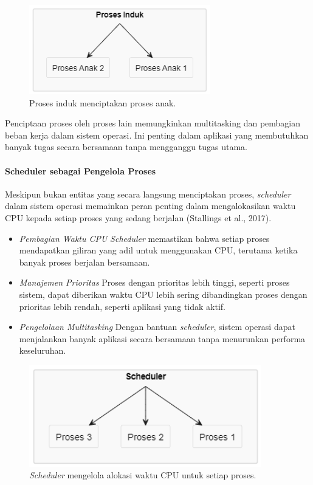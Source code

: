 \documentclass[12pt]{article}
\begin{document}
\begin{figure}[h]
    \centering
    \includegraphics[width=0.7\textwidth]{asset/parent child process creation.png}
    \caption{Proses induk menciptakan proses anak.}
\end{figure}

Penciptaan proses oleh proses lain memungkinkan multitasking dan pembagian beban kerja dalam sistem operasi. Ini penting dalam aplikasi yang membutuhkan banyak tugas secara bersamaan tanpa mengganggu tugas utama.

\paragraph{Scheduler sebagai Pengelola Proses}
Meskipun bukan entitas yang secara langsung menciptakan proses, \textit{scheduler} dalam sistem operasi memainkan peran penting dalam mengalokasikan waktu CPU kepada setiap proses yang sedang berjalan (Stallings et al., 2017).

\begin{itemize}
    \item \textit{Pembagian Waktu CPU} \textit{Scheduler} memastikan bahwa setiap proses mendapatkan giliran yang adil untuk menggunakan CPU, terutama ketika banyak proses berjalan bersamaan.
    \item \textit{Manajemen Prioritas} Proses dengan prioritas lebih tinggi, seperti proses sistem, dapat diberikan waktu CPU lebih sering dibandingkan proses dengan prioritas lebih rendah, seperti aplikasi yang tidak aktif.
    \item \textit{Pengelolaan Multitasking} Dengan bantuan \textit{scheduler}, sistem operasi dapat menjalankan banyak aplikasi secara bersamaan tanpa menurunkan performa keseluruhan.
\end{itemize}

\begin{figure}[h]
    \centering
    \includegraphics[width=0.9\textwidth]{asset/scheduler cpu allocation.png}
    \caption{\textit{Scheduler} mengelola alokasi waktu CPU untuk setiap proses.}
\end{figure}
\end{document}
